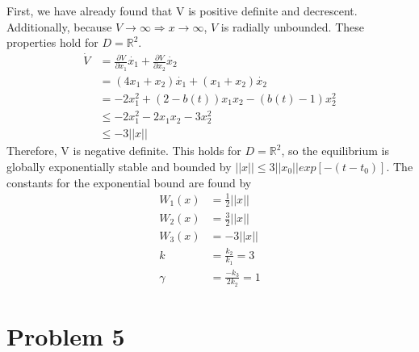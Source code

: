 \documentclass[paper=a4, fontsize=11pt]{scrartcl} %
\numberwithin{equation}{section} %
\numberwithin{figure}{section} %
\numberwithin{table}{section} %
\begin{document}
First, we have already found that V is positive definite and decrescent. Additionally, because $V\rightarrow \infty \Rightarrow x \rightarrow \infty$, $V$ is radially unbounded. These properties hold for $D = \mathbb{R}^2$.
\begin{align}
\dot{V} &= \frac{\partial V}{\partial x_1}\dot{x_1} + \frac{\partial V}{\partial x_2}\dot{x_2} \\
&= (4x_1 + x_2)\dot{x_1} + (x_1+x_2)\dot{x_2} \\
&= -2x_1^2 + (2-b(t))x_1x_2 - (b(t)-1)x_2^2 \\
&\leq -2x_1^2 -2x_1x_2 - 3x_2^2 \\
&\leq -3 \lvert\lvert x \rvert\rvert
\end{align}
Therefore, V is negative definite. This holds for $D = \mathbb{R}^2$, so the equilibrium is globally exponentially stable and bounded by $\lvert\lvert x \rvert\rvert \leq 3\lvert\lvert x_0\rvert\rvert exp[-(t-t_0)]$. The constants for the exponential bound are found by
\begin{align}
W_1(x) &=\frac{1}{2}\lvert\lvert x \rvert\rvert \\
W_2(x) &=\frac{3}{2}\lvert\lvert x \rvert\rvert \\
W_3(x) &=-3\lvert\lvert x \rvert\rvert \\
k &= \frac{k_2}{k_1} = 3 \\
\gamma &= \frac{-k_3}{2k_2} = 1
\end{align}

\newpage

\section{Problem 5}
\end{document}
